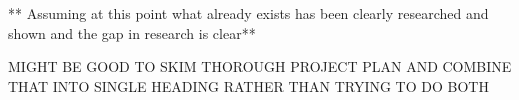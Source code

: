 ** Assuming at this point what already exists has been clearly researched and shown and the gap in research is clear**

MIGHT BE GOOD TO SKIM THOROUGH PROJECT PLAN AND COMBINE THAT INTO SINGLE HEADING RATHER THAN TRYING TO DO BOTH
